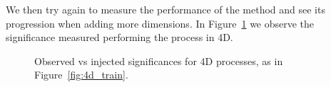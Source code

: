 \documentclass[paper/ddppaper2.tex]{subfiles}
\begin{document}
We then try again to measure the performance of the method and see its progression when adding more dimensions. In Figure~\ref{fig:4d_significances} we observe the significance measured performing the process in 4D.

\begin{figure}
    \caption{Observed vs injected significances for 4D processes, as in Figure~\ref{fig:4d_train}.}
    \label{fig:4d_significances}
\end{figure}
\ifdefined\paper\clearpage\fi


\end{document}

